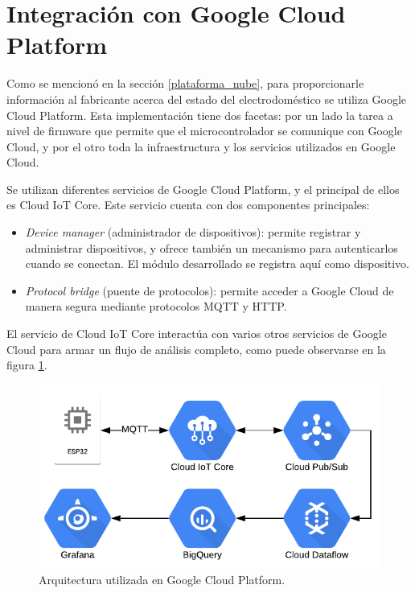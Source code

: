 \section{Integración con Google Cloud Platform}
\label{sec:google_cloud}

Como se mencionó en la sección \ref{plataforma_nube}, para proporcionarle información al fabricante acerca del estado del electrodoméstico se utiliza Google Cloud Platform. Esta implementación tiene dos facetas: por un lado la tarea a nivel de firmware que permite que el microcontrolador se comunique con Google Cloud, y por el otro toda la infraestructura y los servicios utilizados en Google Cloud.

Se utilizan diferentes servicios de Google Cloud Platform, y el principal de ellos es Cloud IoT Core. Este servicio cuenta con dos componentes principales:

\begin{itemize}
	\item \emph{Device manager} (administrador de dispositivos): permite registrar y administrar dispositivos, y ofrece también un mecanismo para autenticarlos cuando se conectan. El módulo desarrollado se registra aquí como dispositivo.
	\item \emph{Protocol bridge} (puente de protocolos): permite acceder a Google Cloud de manera segura mediante protocolos MQTT y HTTP.
\end{itemize}

El servicio de Cloud IoT Core interactúa con varios otros servicios de Google Cloud para armar un flujo de análisis completo, como puede observarse en la figura \ref{fig:google_cloud_diagram}.

\begin{figure}[h]
\centering
\includegraphics[width=\textwidth]{./Figures/google_cloud_diagram.pdf}
\caption{Arquitectura utilizada en Google Cloud Platform.}
\label{fig:google_cloud_diagram}
\end{figure}

